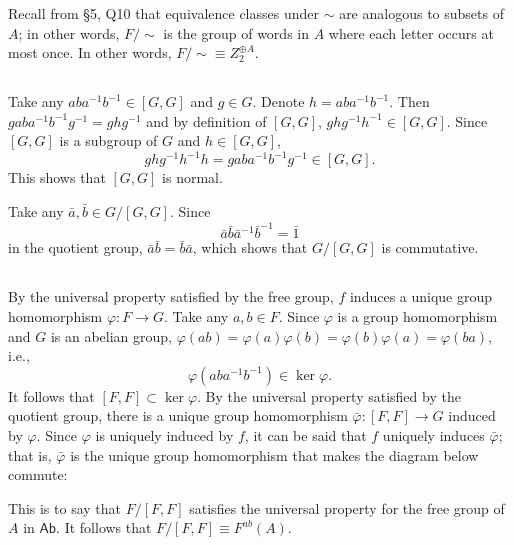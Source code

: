 \documentclass[12pt]{article}
\begin{document}
Recall from \S 5, Q10 that equivalence classes under $\sim$ are analogous to subsets of $A$; 
in other words, $F/\sim$ is the group of words in $A$ where each letter occurs at most once.
In other words, $F/\sim \equiv Z_2^{\oplus A}$.

\setcounter{subsection}{10} 
\subsection{} 
\renewcommand{\grp}{[G, G]}
Take any $aba^{-1} b^{-1} \in \grp$ and $g \in G$.  
Denote $h = aba^{-1}b^{-1}$. 
Then $gaba^{-1}b^{-1}g^{-1} = ghg^{-1}$ and by definition of $\grp$, $ghg^{-1} h^{-1} \in \grp$. 
Since $[G, G]$ is a subgroup of $G$ and $h \in \grp$,
$$ghg^{-1} h^{-1}h = gaba^{-1}b^{-1}g^{-1} \in \grp.$$
This shows that $\grp$ is normal.

Take any $\bar{a}, \bar{b} \in G / \grp$. 
Since 
$$\bar{a} \bar{b} \bar{a}^{-1} \bar{b}^{-1} = \bar{1}$$
in the quotient group, $\bar{a} \bar{b} = \bar{b} \bar{a}$, which shows that $G / \grp$ is commutative. 

\subsection{} 
\renewcommand{\grp}{[F, F]} 
By the universal property satisfied by the free group, $f$ induces a unique group homomorphism $\varphi: F \rightarrow G$. 
Take any $a, b \in F$. 
Since $\varphi$ is a group homomorphism and $G$ is an abelian group, $\varphi(ab) = \varphi(a)\varphi(b) = \varphi(b)\varphi(a) = \varphi(ba)$, 
i.e., 
$$\varphi(aba^{-1} b^{-1}) \in \ker \varphi.$$
It follows that $\grp \subset \ker \varphi$. 
By the universal property satisfied by the quotient group, there is a unique group homomorphism $\bar{\varphi}: \grp \rightarrow G$ induced by $\varphi$. 
Since $\varphi$ is uniquely induced by $f$, it can be said that $f$ uniquely induces $\bar{\varphi}$; 
that is, $\bar{\varphi}$ is the unique group homomorphism that makes the diagram below commute: 
\begin{center}
\end{center}
This is to say that $F / \grp$ satisfies the universal property for the free group of $A$ in $\mathsf{Ab}$. 
It follows that $F / \grp \equiv F^{ab}(A)$. 
\end{document}
